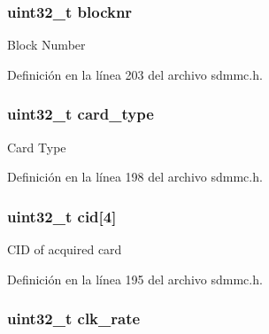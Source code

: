 \subsubsection[{\texorpdfstring{blocknr}{blocknr}}]{\setlength{\rightskip}{0pt plus 5cm}uint32\+\_\+t blocknr}\hypertarget{struct_s_d_m_m_c___c_a_r_d___t_a90cee613097870780dda8c7f8a7e21b7}{}\label{struct_s_d_m_m_c___c_a_r_d___t_a90cee613097870780dda8c7f8a7e21b7}
Block Number 

Definición en la línea 203 del archivo sdmmc.\+h.

\subsubsection[{\texorpdfstring{card\+\_\+type}{card_type}}]{\setlength{\rightskip}{0pt plus 5cm}uint32\+\_\+t card\+\_\+type}\hypertarget{struct_s_d_m_m_c___c_a_r_d___t_a21344812dcaa40c24fcd631b7b8915ea}{}\label{struct_s_d_m_m_c___c_a_r_d___t_a21344812dcaa40c24fcd631b7b8915ea}
Card Type 

Definición en la línea 198 del archivo sdmmc.\+h.

\subsubsection[{\texorpdfstring{cid}{cid}}]{\setlength{\rightskip}{0pt plus 5cm}uint32\+\_\+t cid\mbox{[}4\mbox{]}}\hypertarget{struct_s_d_m_m_c___c_a_r_d___t_aa4aa8ca8ef253ab8b2e4cf237ec93f0f}{}\label{struct_s_d_m_m_c___c_a_r_d___t_aa4aa8ca8ef253ab8b2e4cf237ec93f0f}
C\+ID of acquired card 

Definición en la línea 195 del archivo sdmmc.\+h.

\subsubsection[{\texorpdfstring{clk\+\_\+rate}{clk_rate}}]{\setlength{\rightskip}{0pt plus 5cm}uint32\+\_\+t clk\+\_\+rate}\hypertarget{struct_s_d_m_m_c___c_a_r_d___t_a428a59667f1ee33f4287059b902fad00}{}\label{struct_s_d_m_m_c___c_a_r_d___t_a428a59667f1ee33f4287059b902fad00}


